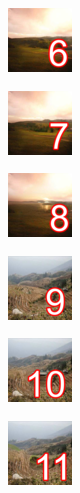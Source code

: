 \documentclass[11pt, a4paper]{article}
\begin{document}
\begin{task}
\begin{gridlayout}{\textwidth}{12cm}
\begin{row}{0.33}
\begin{cell}{0.25}
            \end{cell}
            \begin{cell}{0.25}
                \centering
                \includegraphics[width=0.9\cellwidth]{img/thumbnail-6.png}
            \end{cell}
            \begin{cell}{0.25}
                \centering
                \includegraphics[width=0.9\cellwidth]{img/thumbnail-7.png}
            \end{cell}
            \begin{cell}{0.25}
                \centering
                \includegraphics[width=0.9\cellwidth]{img/thumbnail-8.png}
            \end{cell}
        \end{row}
        \begin{row}{0.34}
            \begin{cell}{0.25}
                \centering
                \includegraphics[width=0.9\cellwidth]{img/thumbnail-9.png}
            \end{cell}
            \begin{cell}{0.25}
                \centering
                \includegraphics[width=0.9\cellwidth]{img/thumbnail-10.png}
            \end{cell}
            \begin{cell}{0.25}
                \centering
                \includegraphics[width=0.9\cellwidth]{img/thumbnail-11.png}

\end{cell}
\end{row}
\end{gridlayout}
\end{task}
\end{document}

